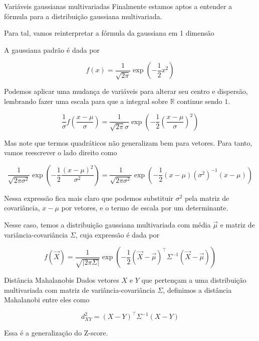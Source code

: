 \documentclass[
  ignorenonframetext,
  aspectratio=169,
]{beamer}
\newcommand{\vX}{\vec{X}}
\newcommand{\vmu}{\vec{\mu}}
\begin{document}
\begin{frame}{Variáveis gaussianas multivariadas}
Finalmente estamos aptos a entender a fórmula para a distribuição
gaussiana multivariada.

Para tal, vamos reinterpretar a fórmula da gaussiana em 1 dimensão
\end{frame}

\begin{frame}
A gaussiana padrão é dada por

\[f(x) = \frac{1}{\sqrt{2\pi}}\exp\left(-\frac{1}{2}x^2\right)\]
\end{frame}

\begin{frame}
Podemos aplicar uma mudança de variáveis para alterar seu centro e
dispersão, lembrando fazer uma escala para que a integral sobre
\(\mathbb
{R}\) continue sendo \(1\).

\[\frac{1}{\sigma}f\left(\frac{x-\mu}{\sigma}\right) = \frac{1}{\sqrt{2\pi}\sigma}\exp\left(-\frac{1}{2}\left(\frac{x-\mu}{\sigma}\right)^2\right)\]
\end{frame}

\begin{frame}
Mas note que termos quadráticos não generalizam bem para vetores. Para
tanto, vamos reescrever o lado direito como

\[\frac{1}{\sqrt{2\pi\sigma^2}}\exp\left(-\frac{1}{2}\frac{(x-\mu)^2}{\sigma^2}\right) = \frac{1}{\sqrt{2\pi\sigma^2}}\exp\left(-\frac{1}{2}(x-\mu)(\sigma^2)^{-1}(x-\mu)\right) \]
\end{frame}

\begin{frame}
Nessa expressão fica mais claro que podemos substituir \(\sigma^2\) pela
matriz de covariância, \(x-\mu\) por vetores, e o termo de escala por um
determinante.

Nesse caso, temos a distribuição gaussiana multivariada com média
\(\vec \mu\) e matriz de variância-covariância \(\Sigma\), cuja
expressão é dada por

\[f(\vX) = \frac{1}{\sqrt{|2\pi\Sigma|}}\exp\left(-\frac{1}{2}\left(\vX-\vmu\right)^\top\Sigma^{-1}\left(\vX-\vmu\right)\right) \]

 
\end{frame} 

\begin{frame}{Distância Mahalanobis}
  Dados vetores \(X\) e \(Y\) que pertençam a uma distribuição
  multivariada com matriz de variância-covariância \(\Sigma\), definimos a distância
  Mahalanobi entre eles como
  
  \[d_{XY}^2 = (X-Y)^\top\Sigma^{-1}(X-Y)\]
  
  Essa é a generalização do Z-score.
  \end{frame}
\end{document}
